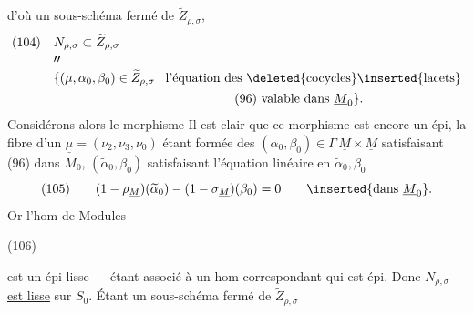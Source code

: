 
d'où un sous-schéma fermé de $\widetilde Z_{\rho,\sigma}$,
\[
\begin{aligned}
(104)\quad&N_{\rho,\sigma}\subset\widetilde Z_{\rho,\sigma}\\[-2pt]
&\prime\prime\\[-2pt]
&\{(\underline\mu,\alpha_0,\beta_0)\in\widetilde Z_{\rho,\sigma}\mid
\text{l'équation des \deleted{cocycles}\inserted{lacets}}\\
&\hspace{5cm}\text{(96) valable dans }\underline M_0\}.
\end{aligned}
\]
Considérons alors le morphisme
Il est clair que ce morphisme est encore un épi, la fibre d'un
$\underline\mu=(\nu_2,\nu_3,\nu_0)$ étant formée des
$(\alpha_0,\beta_0)\in\Gamma\,\underline M\times\underline M$
satisfaisant (96) dans $M_0$,
$(\widetilde\alpha_0,\beta_0)$ satisfaisant l'équation linéaire
en $\widetilde\alpha_0,\beta_0$
\[
(105)\qquad
(1-\rho_{\underline M})(\widetilde\alpha_0)
-(1-\sigma_{\underline M})(\beta_0)=0
\qquad\inserted{\text{dans }\underline M_0}.
\]
Or l'hom de Modules

\begin{samepage}
(106)
\end{samepage}
est un épi lisse --- étant associé à un hom
correspondant qui est  épi.
Donc  $N_{\rho,\sigma}$ \uline{est lisse} sur $S_0$.
 Étant un sous-schéma fermé de $\widetilde Z_{\rho,\sigma}$


